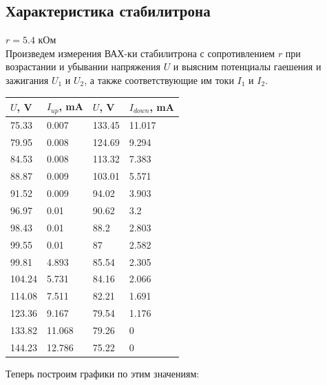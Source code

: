 \documentclass[a4paper,12pt]{article}
\begin{document}
\subsection*{Характеристика стабилитрона}
$r = 5.4$ кОм
\\
Произведем измерения ВАХ-ки стабилитрона с сопротивлением $r$ при возрастании и убывании напряжения $U$ и выясним потенциалы гаешения и зажигания $U_1$ и $U_2$, а также соответствующие им токи $I_1$ и $I_2$.
\begin{table}[h]
\centering
\begin{tabular}{|l|l|l|l|}
\hline
$U$, V & $I_{up}$, mA  & $U$, V & $I_{down}$, mA      \\ \hline
75.33  & 0.007  & 133.45  & 11.017   \\ \hline
79.95  & 0.008  & 124.69   & 9.294   \\ \hline
84.53 & 0.008  & 113.32  & 7.383   \\ \hline
88.87  & 0.009  & 103.01 & 5.571    \\ \hline
91.52  & 0.009  & 94.02  & 3.903   \\ \hline
96.97  & 0.01  &90.62   & 3.2   \\ \hline
98.43  & 0.01  & 88.2  & 2.803   \\ \hline
99.55  & 0.01  & 87  & 2.582   \\ \hline
99.81  & 4.893  & 85.54  & 2.305   \\ \hline
104.24  & 5.731  & 84.16  & 2.066   \\ \hline
114.08  & 7.511  & 82.21  & 1.691   \\ \hline
123.36  & 9.167  & 79.54  & 1.176   \\ \hline
133.82  & 11.068  & 79.26  & 0   \\ \hline
144.23  & 12.786  & 75.22  & 0   \\ \hline
\end{tabular}
\end{table}
Теперь построим графики по этим значениям:
\end{document}
